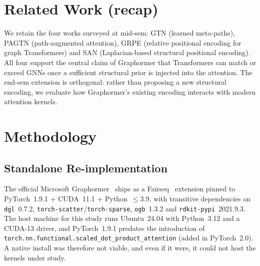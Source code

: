 \documentclass[11pt]{article}
\begin{document}
\section{Related Work (recap)}

We retain the four works surveyed at mid-sem: GTN \cite{gtn} (learned
meta-paths), PAGTN \cite{pagtn} (path-augmented attention), GRPE
\cite{grpe} (relative positional encoding for graph Transformers) and
SAN \cite{san} (Laplacian-based structural positional encoding). All four
support the central claim of Graphormer that Transformers can match or
exceed GNNs once a sufficient structural prior is injected into the
attention. The end-sem extension is orthogonal: rather than proposing a
new structural encoding, we evaluate how Graphormer's existing encoding
interacts with modern attention kernels.

\section{Methodology}

\subsection{Standalone Re-implementation}

The official Microsoft Graphormer~\cite{graphormer-msft} ships as a
Fairseq~\cite{fairseq} extension pinned to PyTorch~1.9.1 + CUDA~11.1 +
Python~$\le$3.9, with transitive dependencies on \texttt{dgl}~0.7.2,
\texttt{torch-scatter}/\texttt{torch-sparse}, \texttt{ogb}~1.3.2 and
\texttt{rdkit-pypi}~2021.9.3. The host machine for this study runs
Ubuntu~24.04 with Python~3.12 and a CUDA-13 driver, and PyTorch~1.9.1
predates the introduction of
\texttt{torch.nn.functional.scaled\_dot\_product\_attention} (added in
PyTorch~2.0). A native install was therefore not viable, and even if it
were, it could not host the kernels under study.
\end{document}
